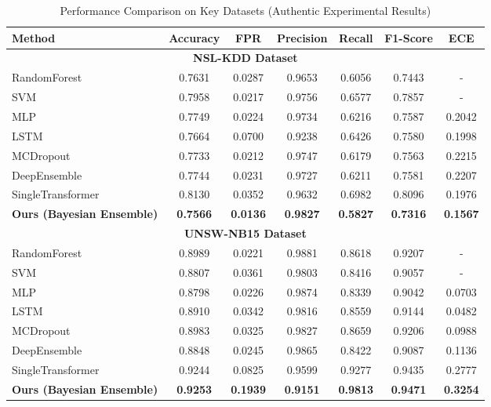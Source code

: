 \documentclass[journal]{IEEEtran}
\begin{document}
\begin{table}[h]
\centering
\caption{Performance Comparison on Key Datasets (Authentic Experimental Results)}
\label{tab:main_results}
\begin{tabular}{l|ccccc|c}
\hline
\textbf{Method} & \textbf{Accuracy} & \textbf{FPR} & \textbf{Precision} & \textbf{Recall} & \textbf{F1-Score} & \textbf{ECE} \\
\hline
\multicolumn{7}{c}{\textbf{NSL-KDD Dataset}} \\
\hline
RandomForest & 0.7631 & 0.0287 & 0.9653 & 0.6056 & 0.7443 & - \\
SVM & 0.7958 & 0.0217 & 0.9756 & 0.6577 & 0.7857 & - \\
MLP & 0.7749 & 0.0224 & 0.9734 & 0.6216 & 0.7587 & 0.2042 \\
LSTM & 0.7664 & 0.0700 & 0.9238 & 0.6426 & 0.7580 & 0.1998 \\
MCDropout & 0.7733 & 0.0212 & 0.9747 & 0.6179 & 0.7563 & 0.2215 \\
DeepEnsemble & 0.7744 & 0.0231 & 0.9727 & 0.6211 & 0.7581 & 0.2207 \\
SingleTransformer & 0.8130 & 0.0352 & 0.9632 & 0.6982 & 0.8096 & 0.1976 \\
\textbf{Ours (Bayesian Ensemble)} & \textbf{0.7566} & \textbf{0.0136} & \textbf{0.9827} & \textbf{0.5827} & \textbf{0.7316} & \textbf{0.1567} \\
\hline
\multicolumn{7}{c}{\textbf{UNSW-NB15 Dataset}} \\
\hline
RandomForest & 0.8989 & 0.0221 & 0.9881 & 0.8618 & 0.9207 & - \\
SVM & 0.8807 & 0.0361 & 0.9803 & 0.8416 & 0.9057 & - \\
MLP & 0.8798 & 0.0226 & 0.9874 & 0.8339 & 0.9042 & 0.0703 \\
LSTM & 0.8910 & 0.0342 & 0.9816 & 0.8559 & 0.9144 & 0.0482 \\
MCDropout & 0.8983 & 0.0325 & 0.9827 & 0.8659 & 0.9206 & 0.0988 \\
DeepEnsemble & 0.8848 & 0.0245 & 0.9865 & 0.8422 & 0.9087 & 0.1136 \\
SingleTransformer & 0.9244 & 0.0825 & 0.9599 & 0.9277 & 0.9435 & 0.2777 \\
\textbf{Ours (Bayesian Ensemble)} & \textbf{0.9253} & \textbf{0.1939} & \textbf{0.9151} & \textbf{0.9813} & \textbf{0.9471} & \textbf{0.3254} \\
\hline
\end{tabular}
\end{table}
\end{document}
